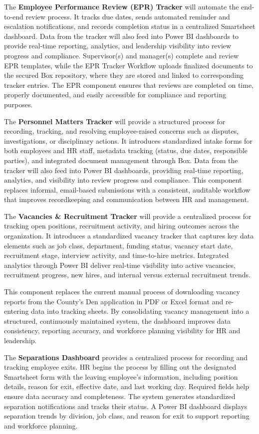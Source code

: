 \documentclass[12pt]{article}
\begin{document}
The \textbf{Employee Performance Review (EPR) Tracker} will automate the end-to-end review process. It tracks due dates, sends automated reminder and escalation notifications, and records completion status in a centralized Smartsheet dashboard. Data from the tracker will also feed into Power BI dashboards to provide real-time reporting, analytics, and leadership visibility into review progress and compliance. Supervisor(s) and manager(s) complete and review EPR templates, while the EPR Tracker Workflow uploads finalized documents to the secured Box repository, where they are stored and linked to corresponding tracker entries. The EPR component ensures that reviews are completed on time, properly documented, and easily accessible for compliance and reporting purposes.

The \textbf{Personnel Matters Tracker} will provide a structured process for recording, tracking, and resolving employee-raised concerns such as disputes, investigations, or disciplinary actions. It introduces standardized intake forms for both employees and HR staff, metadata tracking (status, due dates, responsible parties), and integrated document management through Box. Data from the tracker will also feed into Power BI dashboards, providing real-time reporting, analytics, and visibility into review progress and compliance. This component replaces informal, email-based submissions with a consistent, auditable workflow that improves recordkeeping and communication between HR and management.

The \textbf{Vacancies \& Recruitment Tracker} will provide a centralized process for tracking open positions, recruitment activity, and hiring outcomes across the organization. It introduces a standardized vacancy tracker that captures key data elements such as job class, department, funding status, vacancy start date, recruitment stage, interview activity, and time-to-hire metrics. Integrated analytics through Power BI deliver real-time visibility into active vacancies, recruitment progress, new hires, and internal versus external recruitment trends.

This component replaces the current manual process of downloading vacancy reports from the County’s Den application in PDF or Excel format and re-entering data into tracking sheets. By consolidating vacancy management into a structured, continuously maintained system, the dashboard improves data consistency, reporting accuracy, and workforce planning visibility for HR and leadership.

The \textbf{Separations Dashboard} provides a centralized process for recording and tracking employee exits. HR begins the process by filling out the designated Smartsheet form with  the leaving employee’s information, including position details, reason for exit, effective date, and last working day. Required fields help ensure data accuracy and completeness. The system generates standardized separation notifications and tracks their status. A Power BI dashboard displays separation trends by division, job class, and reason for exit to support reporting and workforce planning.
\end{document}
